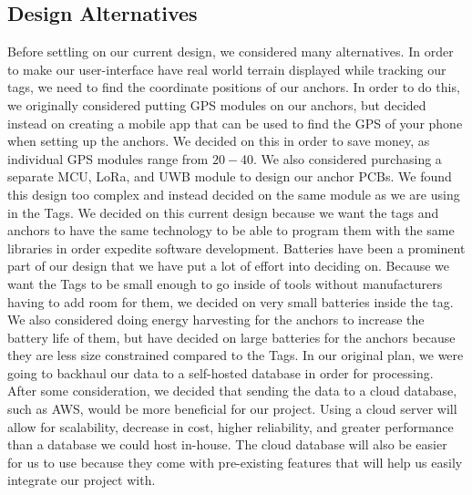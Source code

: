 \documentclass[conference]{IEEEtran}
\begin{document}
\subsection{Design Alternatives}
Before settling on our current design, we considered many alternatives. 
In order to make our user-interface have real world terrain displayed 
while tracking our tags, we need to find the coordinate positions of our 
anchors. In order to do this, we originally considered putting GPS 
modules on our anchors, but decided instead on creating a mobile app 
that can be used to find the GPS of your phone when setting up the 
anchors. We decided on this in order to save money, as individual GPS 
modules range from $20-$40. We also considered purchasing a separate 
MCU, LoRa, and UWB module to design our anchor PCBs. We found this 
design too complex and instead decided on the same module as we are 
using in the Tags. We decided on this current design because we want 
the tags and anchors to have the same technology to be able to program 
them with the same libraries in order expedite software development. 
Batteries have been a prominent part of our design that we have put a 
lot of effort into deciding on. Because we want the Tags to be small 
enough to go inside of tools without manufacturers having to add room 
for them, we decided on very small batteries inside the tag. We also 
considered doing energy harvesting for the anchors to increase the 
battery life of them, but have decided on large batteries for the 
anchors because they are less size constrained compared to the Tags. 
In our original plan, we were going to backhaul our data to a 
self-hosted database in order for processing. After some consideration, 
we decided that sending the data to a cloud database, such as AWS, 
would be more beneficial for our project. Using a cloud server will 
allow for scalability, decrease in cost, higher reliability, and 
greater performance than a database we could host in-house. The cloud 
database will also be easier for us to use because they come with 
pre-existing features that will help us easily integrate our project with.
\end{document}
